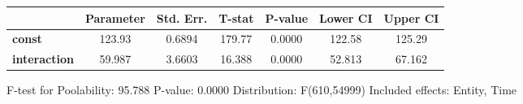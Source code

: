 \begin{center}
\begin{tabular}{lclc}
\end{tabular}
\begin{tabular}{lcccccc}
                     & \textbf{Parameter} & \textbf{Std. Err.} & \textbf{T-stat} & \textbf{P-value} & \textbf{Lower CI} & \textbf{Upper CI}  \\
\midrule
\textbf{const}       &       123.93       &       0.6894       &      179.77     &      0.0000      &       122.58      &       125.29       \\
\textbf{interaction} &       59.987       &       3.6603       &      16.388     &      0.0000      &       52.813      &       67.162       \\
\bottomrule
\end{tabular}
\end{center}

F-test for Poolability: 95.788 \newline
 P-value: 0.0000 \newline
 Distribution: F(610,54999) \newline
  \newline
 Included effects: Entity, Time